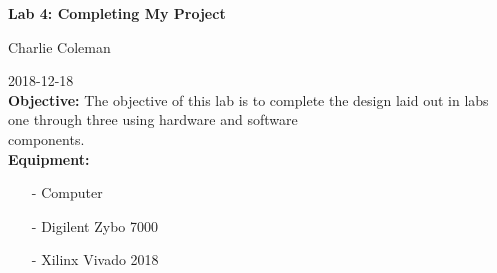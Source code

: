 \documentclass[12pt]{article}
\begin{document}
	\begin{large}
		\noindent \textbf{Lab 4: Completing My Project}
	\end{large}
	\hfill Charlie Coleman
	
	\hfill 2018-12-18\\

	\noindent \textbf{Objective:} The objective of this lab is to complete the design laid out in labs one through three using hardware and software\\ components.\\
	
	\noindent \textbf{Equipment:}
	
	\begin{itemize}[nolistsep, noitemsep]
		\item[-] Computer
		\item[-] Digilent Zybo 7000
		\item[-] Xilinx Vivado 2018
	\end{itemize}~
	
\end{document}
